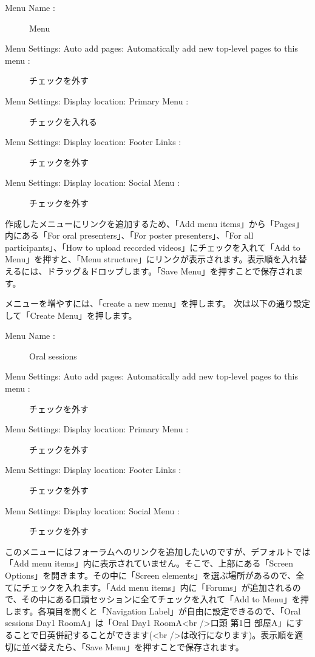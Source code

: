 \documentclass[titlepage,10pt,a4paper,uplatex]{jsbook}
\begin{document}
\begin{description}
\item[Menu Name : ] Menu
\item[Menu Settings: Auto add pages: Automatically add new top-level pages to this menu : ] チェックを外す
\item[Menu Settings: Display location: Primary Menu : ] チェックを入れる
\item[Menu Settings: Display location: Footer Links : ] チェックを外す
\item[Menu Settings: Display location: Social Menu : ] チェックを外す
\end{description}

作成したメニューにリンクを追加するため、「Add menu items」から「Pages」内にある「For oral presenters」、「For poster presenters」、「For all participants」、「How to upload recorded videos」にチェックを入れて「Add to Menu」を押すと、「Menu structure」にリンクが表示されます。表示順を入れ替えるには、ドラッグ＆ドロップします。「Save Menu」を押すことで保存されます。

メニューを増やすには、「create a new menu」を押します。
次は以下の通り設定して「Create Menu」を押します。

\begin{description}
\item[Menu Name : ] Oral sessions
\item[Menu Settings: Auto add pages: Automatically add new top-level pages to this menu : ] チェックを外す
\item[Menu Settings: Display location: Primary Menu : ] チェックを外す
\item[Menu Settings: Display location: Footer Links : ] チェックを外す
\item[Menu Settings: Display location: Social Menu : ] チェックを外す
\end{description}

このメニューにはフォーラムへのリンクを追加したいのですが、デフォルトでは「Add menu items」内に表示されていません。そこで、上部にある「Screen Options」を開きます。その中に「Screen elements」を選ぶ場所があるので、全てにチェックを入れます。「Add menu items」内に「Forums」が追加されるので、その中にある口頭セッションに全てチェックを入れて「Add to Menu」を押します。各項目を開くと「Navigation Label」が自由に設定できるので、「Oral sessions Day1 RoomA」は「Oral Day1 RoomA{\textless}br /{\textgreater}口頭 第1日 部屋A」にすることで日英併記することができます({\textless}br /{\textgreater}は改行になります)。表示順を適切に並べ替えたら、「Save Menu」を押すことで保存されます。
\end{document}
